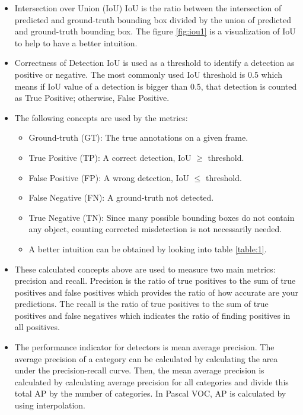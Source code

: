 \documentclass{article}
\begin{document}
\begin{itemize}
    \item Intersection over Union (IoU)
    IoU is the ratio between the intersection of predicted and ground-truth bounding box 
    divided by the union of predicted and ground-truth bounding box. The figure \ref{fig:iou1} is a 
    visualization of IoU to help to have a better intuition.
    \item Correctness of Detection
    IoU is used as a threshold to identify a detection as positive or negative. The 
    most commonly used IoU threshold is 0.5 which means if IoU value of a detection is 
    bigger than 0.5, that detection is counted as True Positive; otherwise, False Positive.
    \item The following concepts are used by the metrics:
    \begin{itemize}
        \item Ground-truth (GT): The true annotations on a given frame.
        \item True Positive (TP): A correct detection, IoU $\geq$ threshold. 
        \item False Positive (FP): A wrong detection, IoU $\leq$ threshold.
        \item False Negative (FN): A ground-truth not detected.
        \item True Negative (TN): Since many possible bounding boxes do not contain any object, 
        counting corrected misdetection is not necessarily needed.
        \item A better intuition can be obtained by looking into table \ref{table:1}.
    \end{itemize}
    \item These calculated concepts above are used to measure two main metrics: precision and 
    recall. Precision is the ratio of true positives to the sum of true positives and false 
    positives which provides the ratio of how accurate are your predictions. The recall is the ratio 
    of true positives to the sum of true positives and false negatives which indicates the ratio of 
    finding positives in all positives.
    \item The performance indicator for detectors is mean average precision. The average precision of a 
    category can be calculated by calculating the area under the precision-recall curve. Then, the mean 
    average precision is calculated by calculating average precision for all categories and divide 
    this total AP by the number of categories. In Pascal VOC, AP is calculated by using interpolation. 

\end{itemize}
\end{document}
